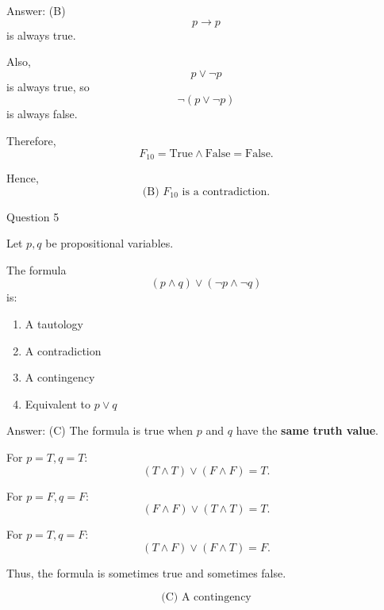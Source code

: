 \documentclass[aspectratio=169,11pt]{beamer}
\begin{document}
\begin{frame}

\begin{block}{Answer: (B)}
$$
p\to p
$$
is always true.

Also,
$$
p\lor\neg p
$$
is always true, so
$$
\neg(p\lor\neg p)
$$
is always false.

Therefore,
$$
F_{10}=\text{True}\land\text{False}
=\text{False}.
$$

Hence,
$$
\boxed{\text{(B) }F_{10}\text{ is a contradiction.}}
$$
\end{block}

\end{frame}
\begin{frame}{Question 5}

Let $p,q$ be propositional variables.

The formula
$$
(p\land q)\lor(\neg p\land\neg q)
$$
is:

\begin{enumerate}
    \item[(A)] A tautology
    \item[(B)] A contradiction
    \item[(C)] A contingency
    \item[(D)] Equivalent to $p\lor q$
\end{enumerate}

\end{frame}

\begin{frame}

\begin{block}{Answer: (C)}
The formula is true when $p$ and $q$ have the \textbf{same truth value}.

For $p=T,q=T$:
$$
(T\land T)\lor(F\land F)=T.
$$

For $p=F,q=F$:
$$
(F\land F)\lor(T\land T)=T.
$$

For $p=T,q=F$:
$$
(T\land F)\lor(F\land T)=F.
$$

Thus, the formula is sometimes true and sometimes false.

$$
\boxed{\text{(C) A contingency}}
$$
\end{block}

\end{frame}
\end{document}
